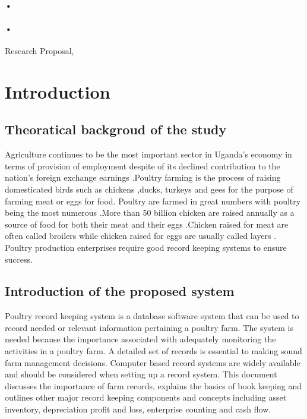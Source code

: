 \documentclass[12pt,]{article}
\begin{document}
\begin{titlepage}
\paragraph*{•}
\paragraph*{•}
  \begin{flushright}
  Research Proposal,\\
 
 \tableofcontents

  \end{flushright}
\date{\today}
\end{titlepage}

\newpage



\section{Introduction}
\subsection{Theoratical backgroud of the study}
Agriculture continues to be the most important sector in Uganda's economy in terms of provision of employment despite of its declined contribution to  the nation's foreign exchange earnings .Poultry farming is the process of raising domesticated birds such as chickens ,ducks, turkeys and gees for the purpose of farming meat or eggs for food. Poultry are farmed in great numbers  with poultry being the  most numerous .More than 50 billion chicken are raised annually as a source of food for both their meat and their eggs .Chicken raised for meat are often called broilers while chicken raised for eggs are usually called  layers . Poultry production enterprises require good record keeping systems to ensure success.


\subsection{Introduction of the proposed system}
Poultry record keeping system is a database software system that can be used to record needed or relevant information pertaining a poultry farm. The system is needed because the importance associated with adequately monitoring the activities in a poultry farm. A detailed set of records is essential to making sound farm management decisions. Computer based record systems are widely available and should be considered when setting up a record system.
This document discusses the importance of farm records, explains the basics of book keeping and outlines other major record keeping components and concepts including asset inventory, depreciation profit and loss, enterprise counting and cash flow. 
\end{document}
